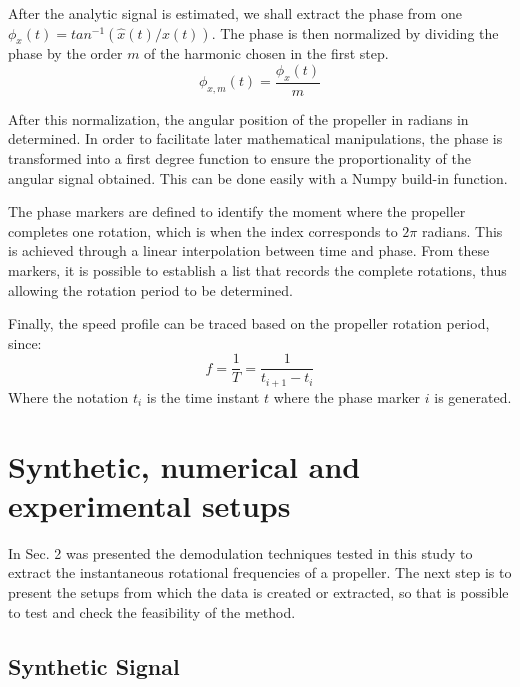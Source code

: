 \documentclass[10pt,fleqn,a4paper,twoside]{article}
\begin{document}
After the analytic signal is estimated, we shall extract the phase from one $\phi_{x} (t) = tan^{-1}(\hat{x}(t)/x(t))$. The phase is then normalized by dividing the phase by the order $m$ of the harmonic chosen in the first step. 
\begin{equation}
    \phi_{x,m} (t)=\frac{\phi_{x}(t)}{m} 
    \label{eq3}
\end{equation}

After this normalization, the angular position of the propeller in radians in determined. In order to facilitate later mathematical manipulations, the phase is transformed into a first degree function to ensure the proportionality of the angular signal obtained. This can be done easily with a Numpy build-in function.

The phase markers are defined to identify the moment where the propeller completes one rotation, which is when the index corresponds to $2\pi$ radians. This is achieved through a linear interpolation between time and phase. From these markers, it is possible to establish a list that records the complete rotations, thus allowing the rotation period to be determined.

Finally, the speed profile can be traced based on the propeller rotation period, since:
\begin{equation}
    f = \frac{1}{T} = \frac{1}{t_{i+1}-t_{i}}
    \label{eq4}
\end{equation}
Where the notation $t_{i}$ is the time instant $t$ where the phase marker $i$ is generated. 

\section{Synthetic, numerical and experimental setups}
In Sec. 2 was presented the demodulation techniques tested in this study to extract the instantaneous rotational frequencies of a propeller. The next step is to present the setups from which the data is created or extracted, so that is possible to test and check the feasibility of the method.

\subsection{Synthetic Signal}
\end{document}
